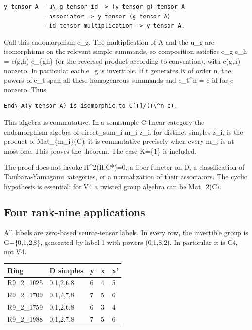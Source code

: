 \begin{verbatim}
y tensor A --u\_g tensor id--> (y tensor g) tensor A
           --associator--> y tensor (g tensor A)
           --id tensor multiplication--> y tensor A.
\end{verbatim}

Call this endomorphism e\_g. The multiplication of A and the u\_g are
isomorphisms on the relevant simple summands, so composition satisfies
e\_g e\_h = c(g,h) e\_\{gh\} (or the reversed product according to
convention), with c(g,h) nonzero. In particular each e\_g is invertible.
If t generates K of order n, the powers of e\_t span all these
homogeneous summands and e\_t\^{}n = c id for c nonzero. Thus

\begin{verbatim}
End\_A(y tensor A) is isomorphic to C[T]/(T\^n-c).
\end{verbatim}

This algebra is commutative. In a semisimple C-linear category the
endomorphism algebra of direct\_sum\_i m\_i z\_i, for distinct simples
z\_i, is the product of Mat\_\{m\_i\}(C); it is commutative precisely
when every m\_i is at most one. This proves the theorem. The case
K=\{1\} is included.

The proof does not invoke H\^{}2(H,C*)=0, a fiber functor on D, a
classification of Tambara-Yamagami categories, or a normalization of
their associators. The cyclic hypothesis is essential: for V4 a twisted
group algebra can be Mat\_2(C).

\hypertarget{four-rank-nine-applications}{%
\subsection{Four rank-nine
applications}\label{four-rank-nine-applications}}

All labels are zero-based source-tensor labels. In every row, the
invertible group is G=\{0,1,2,8\}, generated by label 1 with powers
(0,1,8,2). In particular it is C4, not V4.

\begin{longtable}[]{@{}lllll@{}}
\toprule\noalign{}
Ring & D simples & y & x & x' \\
\midrule\noalign{}
\endhead
\bottomrule\noalign{}
\endlastfoot
R9\_2\_1025 & 0,1,2,6,8 & 6 & 4 & 5 \\
R9\_2\_1709 & 0,1,2,7,8 & 7 & 5 & 6 \\
R9\_2\_1759 & 0,1,2,6,8 & 6 & 3 & 4 \\
R9\_2\_1988 & 0,1,2,7,8 & 7 & 5 & 6 \\
\end{longtable}

